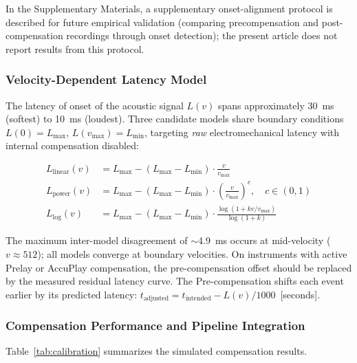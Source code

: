 \documentclass[a4paper]{article}
\theoremstyle{definition}
\theoremstyle{remark}
\begin{document}
In the Supplementary Materials, a supplementary onset-alignment protocol is described for future empirical validation (comparing precompensation and post-compensation recordings through onset detection); the present article does not report results from this protocol.

\subsubsection{Velocity-Dependent Latency Model}

The latency of onset of the acoustic signal $L(v)$ spans approximately 30~ms (softest) to 10~ms (loudest). Three candidate models share boundary conditions $L(0) = L_{\max}$, $L(v_{\max}) = L_{\min}$, targeting \emph{raw} electromechanical latency with internal compensation disabled:

\begin{align}
    L_{\text{linear}}(v) &= L_{\max} - (L_{\max} - L_{\min}) \cdot \frac{v}{v_{\max}} \label{eq:linear} \\
    L_{\text{power}}(v) &= L_{\max} - (L_{\max} - L_{\min}) \cdot \left(\frac{v}{v_{\max}}\right)^c, \quad c \in (0,1) \label{eq:power} \\
    L_{\text{log}}(v) &= L_{\max} - (L_{\max} - L_{\min}) \cdot \frac{\log(1 + kv/v_{\max})}{\log(1+k)} \label{eq:log}
\end{align}

The maximum inter-model disagreement of $\sim$4.9~ms occurs at mid-velocity ($v \approx 512$); all models converge at boundary velocities. On instruments with active Prelay or AccuPlay compensation, the pre-compensation offset should be replaced by the measured residual latency curve. The Pre-compensation shifts each event earlier by its predicted latency: $t_{\text{adjusted}} = t_{\text{intended}} - L(v) / 1000$~[seconds].

\subsubsection{Compensation Performance and Pipeline Integration}

Table~\ref{tab:calibration} summarizes the simulated compensation results.
\end{document}

